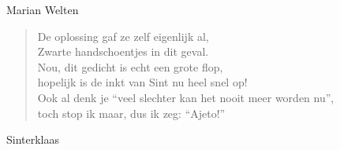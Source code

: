 \documentclass[12pt]{brief}
\begin{document}
\begin{letter}{Marian Welten}
\begin{verse}
De oplossing gaf ze zelf eigenlijk al,\\
Zwarte handschoentjes in dit geval.\\[2em]

Nou, dit gedicht is echt een grote flop,\\
hopelijk is de inkt van Sint nu heel snel op!\\[0.5em]

Ook al denk je ``veel slechter kan het nooit meer worden nu'',\\
toch stop ik maar, dus ik zeg: ``Ajeto!''\\[2em]


\end{verse}


Sinterklaas


\closing{}

\end{letter}
\end{document}
